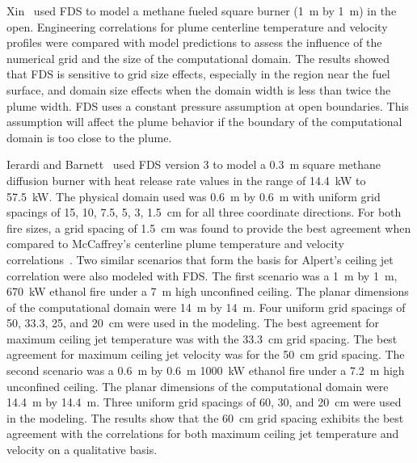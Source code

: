 \documentclass[11pt]{book}
\begin{document}
Xin~\cite{Xin:NFPA2004}  used FDS  to  model a  methane fueled  square
burner (1~m  by 1~m) in  the open. Engineering correlations  for plume
centerline temperature and velocity  profiles were compared with model
predictions to assess the influence of the numerical grid and the size
of the computational domain. The  results showed that FDS is sensitive
to grid size effects, especially  in the region near the fuel surface,
and domain size  effects when the domain width is  less than twice the
plume  width.  FDS  uses   a  constant  pressure  assumption  at  open
boundaries.  This assumption  will affect  the plume  behavior  if the
boundary of the computational domain is too close to the plume.

Ierardi  and Barnett~\cite{Ierardi:1} used  FDS version  3 to  model a
0.3~m square methane diffusion burner with heat release rate values in
the range of 14.4~kW to 57.5~kW. The physical domain used was 0.6~m by
0.6~m with uniform grid spacings of  15, 10, 7.5, 5, 3, 1.5~cm for all
three coordinate  directions. For both  fire sizes, a grid  spacing of
1.5~cm  was found  to  provide  the best  agreement  when compared  to
McCaffrey's     centerline    plume    temperature     and    velocity
correlations~\cite{SFPE:Heskestad}.  Two similar  scenarios  that form
the basis for Alpert's ceiling  jet correlation were also modeled with
FDS. The first scenario was a  1~m by 1~m, 670~kW ethanol fire under a
7~m   high  unconfined   ceiling.   The  planar   dimensions  of   the
computational domain were 14~m by  14~m. Four uniform grid spacings of
50, 33.3, 25, and 20~cm were  used in the modeling. The best agreement
for  maximum  ceiling  jet  temperature  was  with  the  33.3~cm  grid
spacing. The best  agreement for maximum ceiling jet  velocity was for
the  50~cm grid  spacing. The  second scenario  was a  0.6~m  by 0.6~m
1000~kW ethanol fire under a 7.2~m high unconfined ceiling. The planar
dimensions of  the computational domain  were 14.4~m by  14.4~m. Three
uniform  grid  spacings  of  60,  30,  and  20~cm  were  used  in  the
modeling. The  results show that  the 60~cm grid spacing  exhibits the
best  agreement with  the correlations  for both  maximum  ceiling jet
temperature and velocity on a qualitative basis.
\end{document}
